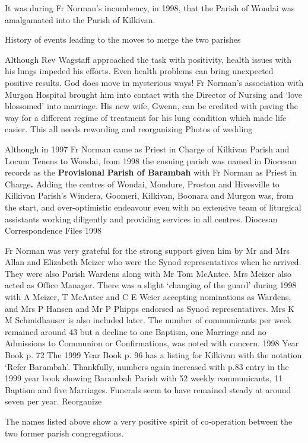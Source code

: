 It was during Fr Norman's incumbency, in 1998, that the Parish of Wondai
was amalgamated into the Parish of Kilkivan.

History of events leading to the moves to merge the two parishes

Although Rev Wagstaff approached the task with positivity, health issues
with his lungs impeded his efforts. Even health problems can bring
unexpected positive results. God does move in mysterious ways! Fr
Norman's association with Murgon Hospital brought him into contact with
the Director of Nursing and `love blossomed' into marriage. His new
wife, Gwenn, can be credited with paving the way for a different regime
of treatment for his lung condition which made life easier. This all
needs rewording and reorganizing Photos of wedding

Although in 1997 Fr Norman came as Priest in Charge of Kilkivan Parish
and Locum Tenens to Wondai, from 1998 the ensuing parish was named in
Diocesan records as the \textbf{Provisional} \textbf{Parish of Barambah}
with Fr Norman as Priest in Charge\textbf{.} Adding the centres of
Wondai, Mondure, Proston and Hivesville to Kilkivan Parish's Windera,
Goomeri, Kilkivan, Boonara and Murgon was, from the start, and
over-optimistic endeavour even with an extensive team of liturgical
assistants working diligently and providing services in all centres.
Diocesan Correspondence Files 1998

Fr Norman was very grateful for the strong support given him by Mr and
Mrs Allan and Elizabeth Meizer who were the Synod representatives when
he arrived. They were also Parish Wardens along with Mr Tom McAntee. Mrs
Meizer also acted as Office Manager. There was a slight `changing of the
guard' during 1998 with A Meizer, T McAntee and C E Weier accepting
nominations as Wardens, and Mrs P Hansen and Mr P Phipps endorsed as
Synod representatives. Mrs K M Schmidhauser is also included later. The
number of communicants per week remained around 43 but a decline to one
Baptism, one Marriage and no Admissions to Communion or Confirmations,
was noted with concern. 1998 Year Book p. 72 The 1999 Year Book p. 96
has a listing for Kilkivan with the notation `Refer Barambah'.
Thankfully, numbers again increased with p.83 entry in the 1999 year
book showing Barambah Parish with 52 weekly communicants, 11 Baptism and
five Marriages. Funerals seem to have remained steady at around seven
per year. Reorganize

The names listed above show a very positive spirit of co-operation
between the two former parish congregations.

